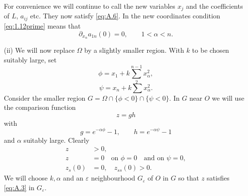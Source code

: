 For convenience we will continue to call the new variables $x_j$ and the coefficients of $L$, $a_{ij}$ etc. They now satisfy \eqref{eq:A.6}. In the new coordinates condition \eqref{eq:1.12prime} means that
\begin{equation}\label{eq:A.7}
	\partial_{x_{\alpha}} a_{1n}(0) = 0,\qquad 1<\alpha<n.
\end{equation}







(ii) We will now replace $\Omega$ by a slightly smaller region.
With $k$ to be chosen suitably large, set
\[\phi = x_1 + k\sum_2^{n-1} x_{\alpha}^2,\]
\[\psi = x_n + k\sum x_{\alpha}^2.\]
Consider the smaller region $G = \Omega\cap\{\phi<0\}\cap\{\psi<0\}$.
In $G$ near $O$ we will use the comparison function
\begin{equation}\label{eq:A.8}
  z = gh
\end{equation}
with \[g = e^{-\alpha\phi} - 1,\qquad h = e^{-\alpha\psi} - 1\]
and $\alpha$ suitably large. Clearly
\begin{align*}
  z & >0, \\
  z & =0\quad \text{on } \phi = 0\quad \text{and on } \psi=0, \\
  z_s(0) & = 0,\quad z_{ss}(0)>0.
\end{align*}
We will choose $k,\alpha$ and an $\varepsilon$ neighbourhood $G_\varepsilon$
of $O$ in $G$ so that $z$ satisfies \eqref{eq:A.3} in $G_\varepsilon$.

